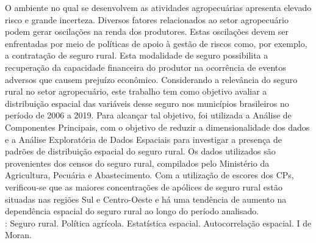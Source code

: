 \noindent O ambiente no qual se desenvolvem as atividades agropecuárias apresenta elevado risco e grande incerteza. Diversos fatores relacionados ao setor agropecuário podem gerar oscilações na renda dos produtores. Estas oscilações devem ser enfrentadas por meio de políticas de apoio à gestão de riscos como, por exemplo, a contratação de seguro rural. Esta modalidade de seguro possibilita a recuperação da capacidade financeira do produtor na ocorrência de eventos adversos que causem prejuízo econômico. Considerando a relevância do seguro rural no setor agropecuário, este trabalho tem como objetivo avaliar a distribuição espacial das variáveis desse seguro nos municípios brasileiros no período de 2006 a 2019. Para alcançar tal objetivo, foi utilizada a Análise de Componentes Principais, com o objetivo de reduzir a dimensionalidade dos dados e a Análise Exploratória de Dados Espaciais para investigar a presença de padrões de distribuição espacial do seguro rural. Os dados utilizados são provenientes dos censos do seguro rural, compilados pelo Ministério da Agricultura, Pecuária e Abastecimento. Com a utilização de escores dos CPs, verificou-se que as maiores concentrações de apólices de seguro rural estão situadas nas regiões Sul e Centro-Oeste e há uma tendência de aumento na dependência espacial do seguro rural ao longo do período analisado. \\
\newline
{}: Seguro rural. Política agrícola. Estatística espacial. Autocorrelação espacial. I de Moran.